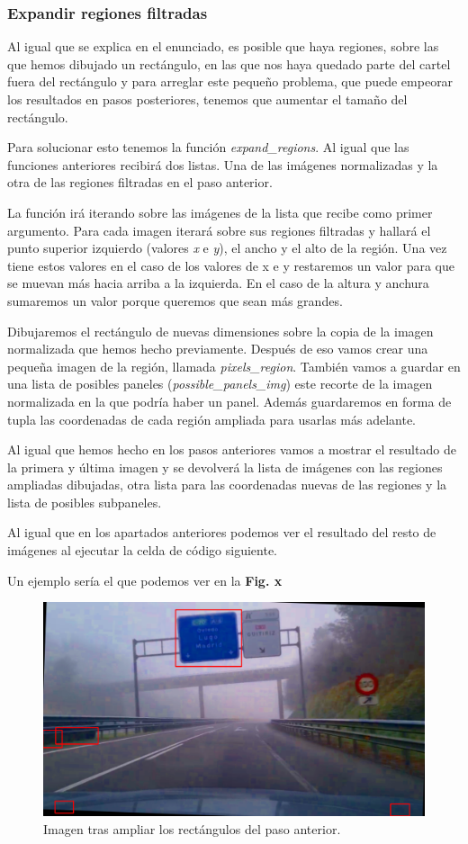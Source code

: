 \documentclass[a4paper, 12pt]{article}
\begin{document}
\subsubsection{Expandir regiones filtradas}
Al igual que se explica en el enunciado, es posible que haya regiones, sobre las que hemos dibujado un rectángulo, en las que nos haya quedado parte del cartel fuera del rectángulo y para arreglar este pequeño problema, que puede empeorar los resultados en pasos posteriores, tenemos que aumentar el tamaño del rectángulo.

Para solucionar esto tenemos la función \textit{expand\_regions}. Al igual que las funciones anteriores recibirá dos listas. Una de las imágenes normalizadas y la otra de las regiones filtradas en el paso anterior.

La función irá iterando sobre las imágenes de la lista que recibe como primer argumento. Para cada imagen iterará sobre sus regiones filtradas y hallará el punto superior izquierdo (valores \textit{x} e \textit{y}), el ancho y el alto de la región. Una vez tiene estos valores en el caso de los valores de x e y restaremos un valor para que se muevan más hacia arriba a la izquierda. En el caso de la altura y anchura sumaremos un valor porque queremos que sean más grandes. 

Dibujaremos el rectángulo de nuevas dimensiones sobre la copia de la imagen normalizada que hemos hecho previamente. Después de eso vamos crear una pequeña imagen de la región, llamada \textit{pixels\_region}. 
También vamos a guardar en una lista de posibles paneles (\textit{possible\_panels\_img}) este recorte de la imagen normalizada en la que podría haber un panel. Además guardaremos en forma de tupla las coordenadas de cada región ampliada para usarlas más adelante. 

Al igual que hemos hecho en los pasos anteriores vamos a mostrar el resultado de la primera y última imagen y se devolverá la lista de imágenes con las regiones ampliadas dibujadas, otra lista para las coordenadas nuevas de las regiones y la lista de posibles subpaneles. 

Al igual que en los apartados anteriores podemos ver el resultado del resto de imágenes al ejecutar la celda de código siguiente. 

Un ejemplo sería el que podemos ver en la \textbf{Fig. x}

\begin{figure}[h]
	\centering
	\includegraphics[width=0.6\linewidth]{img/RectangulosFiltradosExtendidos}
	\caption{Imagen tras ampliar los rectángulos del paso anterior.}
	\label{fig:RectangulosFiltradosExtendidos}
\end{figure}
\end{document}
